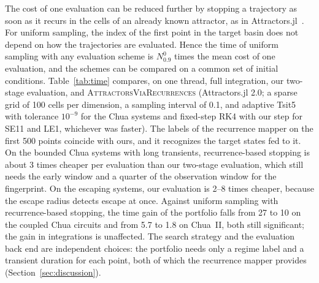 The cost of one evaluation can be reduced further by stopping a trajectory as soon as it recurs in the cells of an already known attractor, as in Attractors.jl~\cite{DatserisWagemakers2022,Datseris2023Framework}. For uniform sampling, the index of the first point in the target basin does not depend on how the trajectories are evaluated. Hence the time of uniform sampling with any evaluation scheme is $N^0_{0.9}$ times the mean cost of one evaluation, and the schemes can be compared on a common set of initial conditions. Table~\ref{tab:time} compares, on one thread, full integration, our two-stage evaluation, and \textsc{AttractorsViaRecurrences} (Attractors.jl 2.0; a sparse grid of 100 cells per dimension, a sampling interval of 0.1, and adaptive Tsit5 with tolerance $10^{-9}$ for the Chua systems and fixed-step RK4 with our step for SE11 and LE1, whichever was faster). The labels of the recurrence mapper on the first 500 points coincide with ours, and it recognizes the target states fed to it. On the bounded Chua systems with long transients, recurrence-based stopping is about 3 times cheaper per evaluation than our two-stage evaluation, which still needs the early window and a quarter of the observation window for the fingerprint. On the escaping systems, our evaluation is 2--8 times cheaper, because the escape radius detects escape at once. Against uniform sampling with recurrence-based stopping, the time gain of the portfolio falls from 27 to 10 on the coupled Chua circuits and from 5.7 to 1.8 on Chua~II, both still significant; the gain in integrations is unaffected. The search strategy and the evaluation back end are independent choices: the portfolio needs only a regime label and a transient duration for each point, both of which the recurrence mapper provides (Section~\ref{sec:discussion}).

